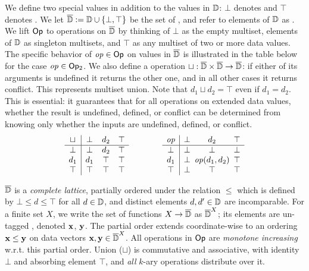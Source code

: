 We define two special values in addition to
the values in $\mathbb{D}$: $\bot$ denotes 
and $\top$ denotes .
We let $\overline{\mathbb{D}{}} := \mathbb{D} \cup \{\bot, \top\}$ be the set of ,
and refer to elements of $\mathbb{D}$ as .
We lift $\textsf{Op}$ to operations on $\overline{\mathbb{D}{}}$ by thinking of $\bot$ as the empty multiset,
elements of $\mathbb{D}$ as singleton multisets, and $\top$ as any multiset of two or more data values.
The specific behavior of $\mathit{op} \in \textsf{Op}$ on values in $\overline{\mathbb{D}{}}$
is illustrated in the table below
for the case $\mathit{op} \in \textsf{Op}{}_2$.
We also define a  operation $\sqcup: \overline{\mathbb{D}{}} \times \overline{\mathbb{D}{}} \to \overline{\mathbb{D}{}}$:
if either of its arguments is undefined it returns the other one,
and in all other cases it returns conflict.
This represents multiset union. Note that $d_1 \sqcup d_2 = \top$ even if $d_1 = d_2$.
This is essential: it guarantees that for all operations on extended data values, whether the result is undefined, defined, or conflict can be determined from knowing only whether the inputs are undefined, defined, or conflict.
\[
\begin{array}{c|ccc}
\sqcup & \bot & d_2 & \top \\
\hline
\bot & \bot & d_2 & \top \\
d_1 & d_1 & \top & \top \\
\top & \top & \top & \top
\end{array}
\qquad \qquad
\begin{array}{c|ccc}
\mathit{op} & \bot & d_2 & \top \\
\hline
\bot & \bot & \bot & \bot \\
d_1 & \bot & \hspace{-5pt}\mathit{op}(d_1,d_2)\hspace{-5pt} & \top \\
\top & \bot & \top & \top
\end{array}
\]

$\overline{\mathbb{D}{}}$ is a \emph{complete lattice}, partially ordered under the
relation $\le$ which is defined by $\bot \le d \le \top$ for all $d \in \mathbb{D}$,
and distinct elements $d, d' \in \mathbb{D}$ are incomparable.
For a finite set $X$, we write the set of functions $X \to \overline{\mathbb{D}{}}$ as $\overline{\mathbb{D}{}}^X$; its elements are un-tagged , denoted $\textbf{x}$, $\textbf{y}$.
The partial order extends coordinate-wise to an ordering $\textbf{x} \le \textbf{y}$ on data vectors $\textbf{x}, \textbf{y} \in \overline{\mathbb{D}{}}^X$.
All operations in $\textsf{Op}{}$ are \emph{monotone increasing}
w.r.t. this partial order.
Union ($\sqcup$) is commutative and associative, with identity $\bot$ and absorbing element $\top$,
and \emph{all} $k$-ary operations distribute over it.


